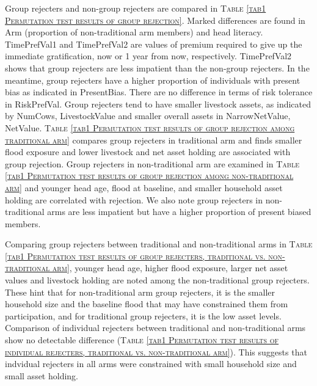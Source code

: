 	Group rejecters and non-group rejecters are compared in \textsc{\normalsize Table \ref{tab1 Permutation test results of group rejection}}. Marked differences are found in \textsf{Arm} (proportion of non-\textsf{traditional} arm members) and head literacy. \textsf{TimePrefVal1} and \textsf{TimePrefVal2} are values of premium required to give up the immediate gratification, now or 1 year from now, respectively. \textsf{TimePrefVal2} shows that group rejecters are less impatient than the non-group rejecters. In the meantime, group rejecters have a higher proportion of individuals with present bias as indicated in \textsf{PresentBias}. There are no difference in terms of risk tolerance in \textsf{RiskPrefVal}. Group rejecters tend to have smaller livestock assets, as indicated by \textsf{NumCows, LivestockValue} and smaller overall assets in \textsf{NarrowNetValue, NetValue}. 
	\textsc{\normalsize Table \ref{tab1 Permutation test results of group rejection among traditional arm}} compares group rejecters in \textsf{traditional} arm and finds smaller flood exposure and lower livestock and net asset holding are associated with group rejection. Group rejecters in non-\textsf{traditional} arm are examined in \textsc{\normalsize Table \ref{tab1 Permutation test results of group rejection among non-traditional arm}} and younger head age, flood at baseline, and smaller household asset holding are correlated with rejection. We also note group rejecters in non-\textsf{traditional} arms are less impatient but have a higher proportion of present biased members. 

	Comparing group rejecters between \textsf{traditional} and non-\textsf{traditional} arms in \textsc{\normalsize Table \ref{tab1 Permutation test results of group rejecters, traditional vs. non-traditional arm}}, younger head age, higher flood exposure, larger net asset values and livestock holding are noted among the non-\textsf{traditional} group rejecters. These hint that for non-\textsf{traditional} arm group rejecters, it is the smaller household size and the baseline flood that may have constrained them from participation, and for \textsf{traditional} group rejecters, it is the low asset levels. Comparison of individual rejecters between \textsf{traditional} and non-\textsf{traditional} arms show no detectable difference (\textsc{\normalsize Table \ref{tab1 Permutation test results of individual rejecters, traditional vs. non-traditional arm}}). This suggests that indvidual rejecters in all arms were constrained with small household size and small asset holding.

